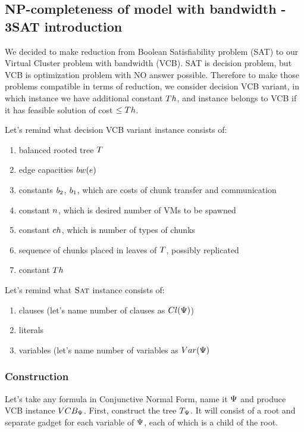 \subsection{NP-completeness of model with bandwidth -
 3SAT introduction}

We decided to make reduction from Boolean Satisfiability problem (SAT)
to our Virtual Cluster problem with bandwidth (VCB). SAT is decision
problem, but VCB is optimization problem with NO answer
possible. Therefore to make those problems compatible in terms of
reduction, we consider decision VCB variant, in which instance we have
additional constant $Th$, and instance belongs to VCB if it has feasible
solution of cost $\leq Th$.

Let's remind what decision VCB variant instance consists of:
\begin{enumerate}
\item balanced rooted tree $T$ 
\item edge capacities $bw(e)$
\item constants $b_2$, $b_1$, which are costs of chunk transfer and
communication
\item constant $n$, which is desired number of VMs to be spawned
\item constant $ch$, which is number of types of chunks
\item sequence of chunks placed in leaves of $T$, possibly replicated
\item constant $Th$
\end{enumerate}

Let's remind what $\textsc{Sat}$ instance consists of:
\begin{enumerate}
\item clauses (let's name number of clauses as $Cl(\Psi)$)
\item literals
\item variables (let's name number of variables as $Var(\Psi)$
\end{enumerate}

\subsubsection{Construction}
Let's take any formula in Conjunctive Normal Form, name it $\Psi$ and produce
VCB instance $VCB_{\Psi}$. First, construct the tree $T_{\Psi}$. It will consist of
a root and separate gadget for each variable of $\Psi$, each of which
is a child of the root.


